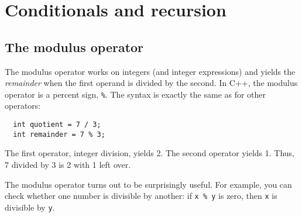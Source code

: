 






\chapter{Conditionals and recursion}
\label{condrecursion}

\section{The modulus operator}

The modulus operator works on integers (and integer expressions)
and yields the {\em remainder} when the first operand is divided
by the second.  In C++, the modulus operator is a percent sign,
{\tt \%}.  The syntax is exactly the same as for other operators:

\begin{lstlisting}
  int quotient = 7 / 3;
  int remainder = 7 % 3;
\end{lstlisting}
%
The first operator, integer division, yields 2.  The second
operator yields 1.  Thus, 7 divided by 3 is 2 with 1 left over.

The modulus operator turns out to be surprisingly useful.  For
example, you can check whether one number is divisible by
another: if {\tt x \% y} is zero, then {\tt x} is divisible
by {\tt y}.

